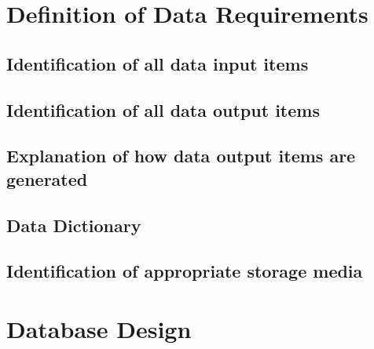 \section{Definition of Data Requirements}

\subsection{Identification of all data input items}

\subsection{Identification of all data output items}

\subsection{Explanation of how data output items are generated}

\subsection{Data Dictionary}

\subsection{Identification of appropriate storage media}

\section{Database Design}

